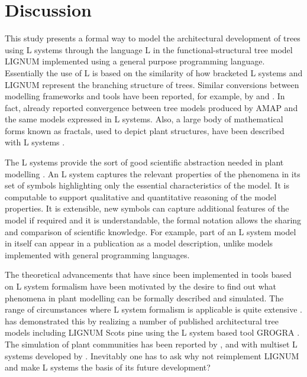 \section{Discussion}

This  study   presents  a  formal  way  to   model  the  architectural
development of  trees using  L systems through  the language L  in the
functional-structural  tree model LIGNUM  implemented using  a general
purpose programming  language.  Essentially the  use of L is  based on
the similarity  of how  bracketed L systems  and LIGNUM  represent the
branching structure  of trees.  Similar  conversions between modelling
frameworks   and   tools  have   been   reported,   for  example,   by
\citet{ferraro:02}   and   \citet{dzierzon:03}.    In  fact,   already
\citet{kurth:em94} reported  convergence between tree  models produced
by AMAP  and the same  models expressed in  L systems.  Also,  a large
body of  mathematical forms  known as fractals,  used to  depict plant
structures, have been described with L systems \citep{kurth:99}.

The L systems  provide the sort of good  scientific abstraction needed
in plant modelling \citep[c.f.][]{regev:02}.  An L system captures the
relevant  properties   of  the  phenomena   in  its  set   of  symbols
highlighting only  the essential characteristics of the  model.  It is
computable to  support qualitative  and quantitative reasoning  of the
model  properties.    It  is  extensible,  new   symbols  can  capture
additional features of the model if required and it is understandable,
the formal  notation allows the  sharing and comparison  of scientific
knowledge.   For example,  part of  an L  system model  in  itself can
appear  in  a  publication  as  a  model  description,  unlike  models
implemented with general programming languages.

The theoretical advancements that have since been implemented in tools
based on L system formalism have  been motivated by the desire to find
out what  phenomena in plant  modelling can be formally  described and
simulated.   The range of  circumstances where  L system  formalism is
applicable  is quite  extensive  \citep{pp:99}.  \citet{kurth:99}  has
demonstrated  this by  realizing a  number of  published architectural
tree models including LIGNUM Scots pine \citep{perttunen:96} using the
L system  based tool GROGRA \citep{kurth:94}. The  simulation of plant
communities has been  reported by \citet{deussen:98}, \citet{kurth:99}
and with multiset L  systems developed by \citet{lane:02}.  Inevitably
one has to ask why not reimplement LIGNUM and make L systems the basis
of its future development?

